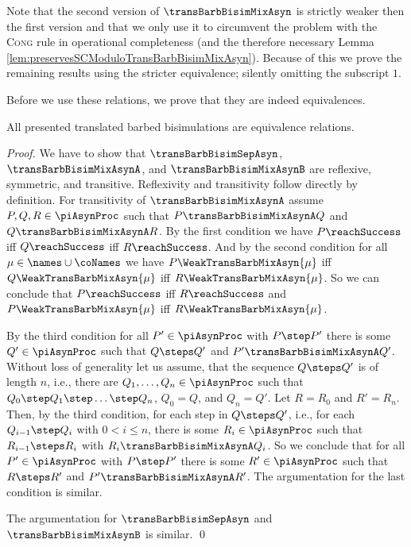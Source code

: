 \documentclass[]{llncs}
\begin{document}
Note that the second version of $ \transBarbBisimMixAsyn $ is strictly weaker then the first version and that we only use it to circumvent the problem with the \textsc{Cong} rule in operational completeness (and the therefore necessary Lemma \ref{lem:preservesSCModuloTransBarbBisimMixAsyn}). Because of this we prove the remaining results using the stricter equivalence; silently omitting the subscript $ 1 $.

Before we use these relations, we prove that they are indeed equivalences.

\begin{lemma} \label{lem:transBarbBisimIsEquivalence}
	All presented translated barbed bisimulations are equivalence relations.
\end{lemma}

\begin{proof}
	We have to show that $ \transBarbBisimSepAsyn $, $ \transBarbBisimMixAsynA $, and $ \transBarbBisimMixAsynB $ are reflexive, symmetric, and transitive. Reflexivity and transitivity follow directly by definition. For transitivity of $ \transBarbBisimMixAsynA $ assume $ P, Q, R \in \piAsynProc $ such that $ P \transBarbBisimMixAsynA Q $ and $ Q \transBarbBisimMixAsynA R $. By the first condition we have $ P\reachSuccess $ iff $ Q\reachSuccess $ iff $ R\reachSuccess $. And by the second condition for all $ \mu \in \names \cup \coNames $ we have $ P\WeakTransBarbMixAsyn{\mu} $ iff $ Q\WeakTransBarbMixAsyn{\mu} $ iff $ R\WeakTransBarbMixAsyn{\mu} $. So we can conclude that $ P\reachSuccess $ iff $ R\reachSuccess $ and $ P\WeakTransBarbMixAsyn{\mu} $ iff $ R \WeakTransBarbMixAsyn{\mu} $.
	
	By the third condition for all $ P' \in \piAsynProc $ with $ P \step P' $ there is some $ Q' \in \piAsynProc $ such that $ Q \steps Q' $ and $ P' \transBarbBisimMixAsynA Q' $. Without loss of generality let us assume, that the sequence $ Q \steps Q' $ is of length $ n $, i.e., there are $ Q_1, \ldots, Q_n \in \piAsynProc $ such that $ Q_0 \step Q_1 \step \ldots \step Q_n $, $ Q_0 = Q $, and $ Q_n = Q' $. Let $ R = R_0 $ and $ R' = R_n $. Then, by the third condition, for each step in $ Q \steps Q' $, i.e., for each $ Q_{i - 1} \step Q_i $ with $ 0 < i \leq n $, there is some $ R_i \in \piAsynProc $ such that $ R_{i - 1} \steps R_i $ with $ R_i \transBarbBisimMixAsynA Q_i $. So we conclude that for all $ P' \in \piAsynProc $ with $ P \step P' $ there is some $ R' \in \piAsynProc $ such that $ R \steps R' $ and $ P' \transBarbBisimMixAsynA R' $. The argumentation for the last condition is similar.
	
	The argumentation for $ \transBarbBisimSepAsyn $ and $ \transBarbBisimMixAsynB $ is similar.
	\qed
\end{proof}
\end{document}
